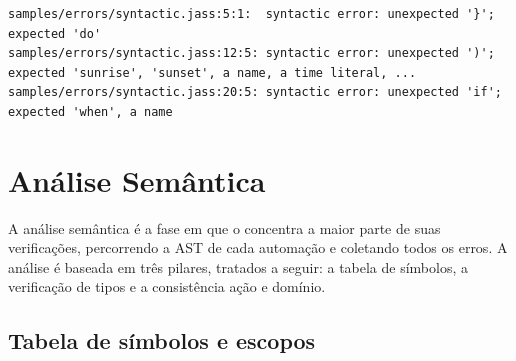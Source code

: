 \documentclass[12pt]{article}
\renewcommand\texttt[1]{\svtt{\small#1}}
\begin{document}

\begin{listing}[H]
    \centering
    \begin{verbatim}
samples/errors/syntactic.jass:5:1:  syntactic error: unexpected '}'; expected 'do'
samples/errors/syntactic.jass:12:5: syntactic error: unexpected ')'; expected 'sunrise', 'sunset', a name, a time literal, ...
samples/errors/syntactic.jass:20:5: syntactic error: unexpected 'if'; expected 'when', a name
    \end{verbatim}
    \caption{Três erros sintáticos relatados em uma só execução. Após
    cada falha, o \emph{parser} avança até a próxima \texttt{automation}
    e recomeça.}
    \label{lst:syntactic_errors}
\end{listing}


\section{Análise Semântica}

A análise semântica é a fase em que o \texttt{jass} concentra a maior
parte de suas verificações, percorrendo a AST de cada automação e coletando 
todos os erros. A análise é baseada em três pilares, tratados a seguir: a tabela de
símbolos, a verificação de tipos e a consistência ação e domínio.

\subsection{Tabela de símbolos e escopos}
\end{document}
